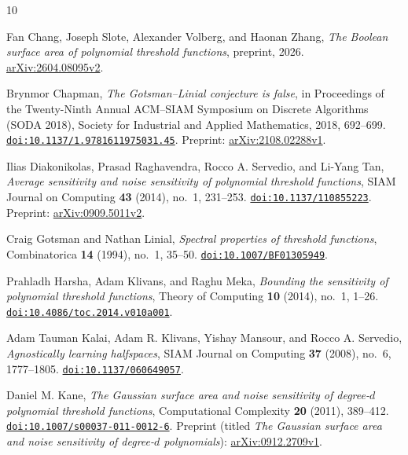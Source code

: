 \begin{thebibliography}{10}

Fan Chang, Joseph Slote, Alexander Volberg, and Haonan Zhang,
\emph{The Boolean surface area of polynomial threshold functions},
preprint, 2026.
\href{https://arxiv.org/abs/2604.08095v2}{arXiv:2604.08095v2}.

Brynmor Chapman,
\emph{The Gotsman--Linial conjecture is false},
in Proceedings of the Twenty-Ninth Annual ACM--SIAM Symposium on Discrete
Algorithms (SODA 2018), Society for Industrial and Applied Mathematics,
2018, 692--699.
\href{https://doi.org/10.1137/1.9781611975031.45}{\nolinkurl{doi:10.1137/1.9781611975031.45}}.
Preprint: \href{https://arxiv.org/abs/2108.02288v1}{arXiv:2108.02288v1}.

Ilias Diakonikolas, Prasad Raghavendra, Rocco A. Servedio, and Li-Yang Tan,
\emph{Average sensitivity and noise sensitivity of polynomial threshold functions},
SIAM Journal on Computing \textbf{43} (2014), no.~1, 231--253.
\href{https://doi.org/10.1137/110855223}{\nolinkurl{doi:10.1137/110855223}}.
Preprint: \href{https://arxiv.org/abs/0909.5011v2}{arXiv:0909.5011v2}.

Craig Gotsman and Nathan Linial,
\emph{Spectral properties of threshold functions},
Combinatorica \textbf{14} (1994), no.~1, 35--50.
\href{https://doi.org/10.1007/BF01305949}{\nolinkurl{doi:10.1007/BF01305949}}.

Prahladh Harsha, Adam Klivans, and Raghu Meka,
\emph{Bounding the sensitivity of polynomial threshold functions},
Theory of Computing \textbf{10} (2014), no.~1, 1--26.
\href{https://doi.org/10.4086/toc.2014.v010a001}{\nolinkurl{doi:10.4086/toc.2014.v010a001}}.

Adam Tauman Kalai, Adam R. Klivans, Yishay Mansour, and Rocco A. Servedio,
\emph{Agnostically learning halfspaces},
SIAM Journal on Computing \textbf{37} (2008), no.~6, 1777--1805.
\href{https://doi.org/10.1137/060649057}{\nolinkurl{doi:10.1137/060649057}}.

Daniel M. Kane,
\emph{The Gaussian surface area and noise sensitivity of degree-$d$
polynomial threshold functions},
Computational Complexity \textbf{20} (2011), 389--412.
\href{https://doi.org/10.1007/s00037-011-0012-6}{\nolinkurl{doi:10.1007/s00037-011-0012-6}}.
Preprint (titled \emph{The Gaussian surface area and noise sensitivity of
degree-$d$ polynomials}):
\href{https://arxiv.org/abs/0912.2709v1}{arXiv:0912.2709v1}.


\end{thebibliography}
